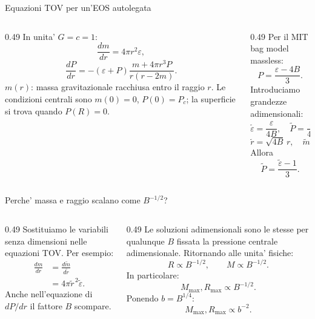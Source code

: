 \begin{frame}{Equazioni TOV per un'EOS autolegata}
\footnotesize
\begin{columns}[T,onlytextwidth]
\begin{column}{0.49\textwidth}
In unita' $G=c=1$:
\[
\frac{dm}{dr}=4\pi r^2\varepsilon,
\]
\[
\frac{dP}{dr}=-(\varepsilon+P)
\frac{m+4\pi r^3P}{r(r-2m)}.
\]
$m(r)$: massa gravitazionale racchiusa
entro il raggio $r$.
\medskip
Le condizioni centrali sono
$m(0)=0$, $P(0)=P_c$; la superficie
si trova quando $P(R)=0$.
\end{column}
\begin{column}{0.49\textwidth}
Per il MIT bag model massless:
\[
P=\frac{\varepsilon-4B}{3}.
\]
Introduciamo grandezze adimensionali:
\[
\widetilde\varepsilon=\frac\varepsilon{4B},
\quad\widetilde P=\frac P{4B},
\]
\[
\widetilde r=\sqrt{4B}\,r,
\quad\widetilde m=\sqrt{4B}\,m.
\]
Allora
\[
\widetilde P=\frac{\widetilde\varepsilon-1}{3}.
\]
\end{column}
\end{columns}
\end{frame}

\begin{frame}{Perche' massa e raggio scalano come $B^{-1/2}$?}
\small
\begin{columns}[T,onlytextwidth]
\begin{column}{0.49\textwidth}
Sostituiamo le variabili senza dimensioni
nelle equazioni TOV.
\medskip
Per esempio:
\begin{align*}
\frac{dm}{dr}
&=\frac{d\widetilde m}{d\widetilde r}\\
&=4\pi\widetilde r^{\,2}
\widetilde\varepsilon.
\end{align*}
Anche nell'equazione di $dP/dr$
il fattore $B$ scompare.
\end{column}
\begin{column}{0.49\textwidth}
Le soluzioni adimensionali sono le stesse
per qualunque $B$ fissata la pressione
centrale adimensionale.
\medskip
Ritornando alle unita' fisiche:
\[
R\propto B^{-1/2},\qquad M\propto B^{-1/2}.
\]
In particolare:
\[
M_{\max},R_{\max}\propto B^{-1/2}.
\]
Ponendo $b=B^{1/4}$:
\[
M_{\max},R_{\max}\propto b^{-2}.
\]
\end{column}
\end{columns}
\end{frame}


